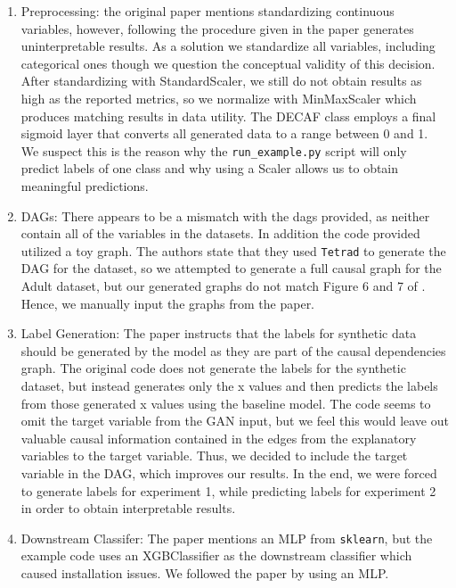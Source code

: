 \begin{enumerate}[label=(\roman*)]

    \item Preprocessing: the original paper mentions standardizing continuous variables, however, following the procedure given in the paper generates uninterpretable results. As a solution we standardize all variables, including categorical ones though we question the conceptual validity of this decision. After standardizing with StandardScaler, we still do not obtain results as high as the reported metrics, so we normalize with MinMaxScaler which  produces matching results in data utility. The DECAF class employs a final sigmoid layer that converts all generated data to a range between 0 and 1. We suspect this is the reason why the \texttt{run\_example.py} script will only predict labels of one class and why using a Scaler allows us to obtain meaningful predictions.
    
    \item DAGs: There appears to be a mismatch with the dags provided, as neither contain all of the variables in the datasets. In addition the code provided utilized a toy graph. The authors state that they used \texttt{Tetrad} to generate the DAG for the dataset, so we attempted to generate a full causal graph for the Adult dataset, but our generated graphs do not match Figure 6 and 7 of \citep{DBLP:conf/nips/BreugelKBS21}. Hence, we manually input the graphs from the paper. 

    \item Label Generation: The paper instructs that the labels for synthetic data should be generated by the model as they are part of the causal dependencies graph. The original code does not generate the labels for the synthetic dataset, but instead generates only the x values and then predicts the labels from those generated x values using the baseline model. The code seems to omit the target variable from the GAN input, but we feel this would leave out valuable causal information contained in the edges from the explanatory variables to the target variable. Thus, we decided to include the target variable in the DAG, which improves our results. In the end, we were forced to generate labels for experiment 1, while predicting labels for experiment 2 in order to obtain interpretable results.
    
    \item Downstream Classifer: The paper mentions an MLP from \texttt{sklearn}, but the example code uses an XGBClassifier as the downstream classifier which caused installation issues. We followed the paper by using an MLP.

\end{enumerate}

